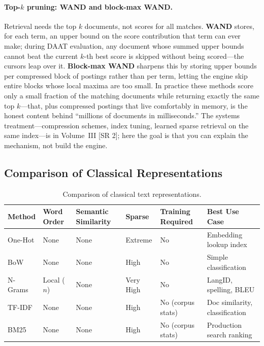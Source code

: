 \paragraph{Top-$k$ pruning: WAND and block-max WAND.}
Retrieval needs the top $k$ documents, not scores for all matches. \textbf{WAND}
stores, for each term, an upper bound on the score contribution that term can ever
make; during DAAT evaluation, any document whose summed upper bounds cannot beat the
current $k$-th best score is skipped without being scored---the cursors leap over it.
\textbf{Block-max WAND} sharpens this by storing upper bounds per compressed block of
postings rather than per term, letting the engine skip entire blocks whose local
maxima are too small. In practice these methods score only a small fraction of the
matching documents while returning exactly the same top $k$---that, plus compressed
postings that live comfortably in memory, is the honest content behind ``millions of
documents in milliseconds.'' The systems treatment---compression schemes, index
tuning, learned sparse retrieval on the same index---is in Volume~III [SR 2]; here the
goal is that you can explain the mechanism, not build the engine.

\subsection{Comparison of Classical Representations}
\label{sec:repr_comparison}

\begin{table}[H]
\centering
\caption{Comparison of classical text representations.}
\label{tab:classical_repr}
\small
\begin{tabular}{@{}p{2.2cm}p{1.6cm}p{1.6cm}p{1.4cm}p{2.2cm}p{3.8cm}@{}}
\toprule
\textbf{Method} & \textbf{Word Order} & \textbf{Semantic Similarity} & \textbf{Sparse} & \textbf{Training Required} & \textbf{Best Use Case} \\
\midrule
One-Hot & None & None & Extreme & No & Embedding lookup index \\
BoW & None & None & High & No & Simple classification \\
N-Grams & Local ($n$) & None & Very High & No & LangID, spelling, BLEU \\
TF-IDF & None & None & High & No (corpus stats) & Doc similarity, classification \\
BM25 & None & None & High & No (corpus stats) & Production search ranking \\
\bottomrule
\end{tabular}
\end{table}

